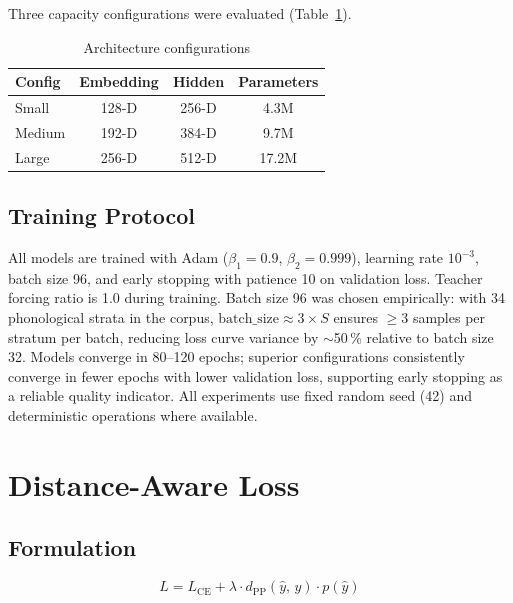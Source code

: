 \documentclass[conference]{IEEEtran}
\newcommand{\dpp}{d_{\mathrm{PP}}}        %
\newcommand{\LCE}{L_{\mathrm{CE}}}        %
\newcommand{\lam}{\lambda}                %
\begin{document}
Three capacity configurations were evaluated
(Table~\ref{tab:configs}).

\begin{table}[t]
  \caption{Architecture configurations}
  \label{tab:configs}
  \centering\small
  \begin{tabular}{lccc}
    \toprule
    Config  & Embedding & Hidden & Parameters \\
    \midrule
    Small   & 128-D & 256-D & 4.3M \\
    Medium  & 192-D & 384-D & 9.7M \\
    Large   & 256-D & 512-D & 17.2M \\
    \bottomrule
  \end{tabular}
\end{table}

\subsection{Training Protocol}

All models are trained with Adam ($\beta_1\!=\!0.9$,
$\beta_2\!=\!0.999$), learning rate $10^{-3}$, batch size 96,
and early stopping with patience 10 on validation loss.
Teacher forcing ratio is 1.0 during training.
Batch size 96 was chosen empirically: with 34 phonological strata
in the corpus, $\text{batch\_size} \approx 3 \times S$ ensures
$\geq$3 samples per stratum per batch, reducing loss curve
variance by $\sim$50\,\% relative to batch size 32.
Models converge in 80--120 epochs; superior configurations
consistently converge in fewer epochs with lower validation loss,
supporting early stopping as a reliable quality indicator.
All experiments use fixed random seed (42) and deterministic
operations where available.

\section{Distance-Aware Loss}
\label{sec:daloss}

\subsection{Formulation}

\begin{equation}
  \boxed{L = \LCE + \lam \cdot \dpp(\hat{y},\, y) \cdot p(\hat{y})}
  \label{eq:daloss}
\end{equation}
\end{document}

